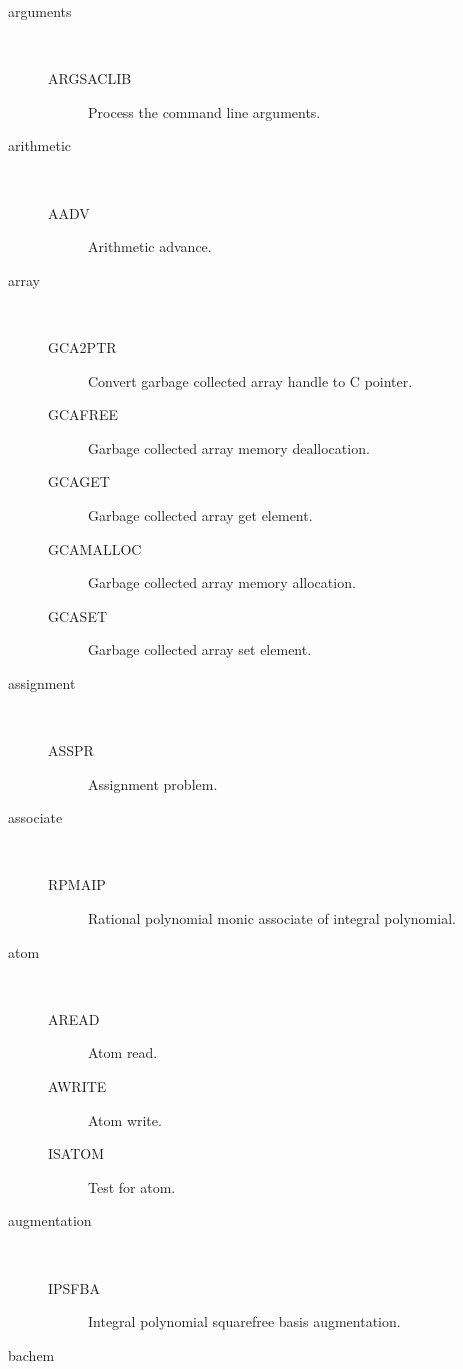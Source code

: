 \begin{description}
\begin{description}
  \end{description}
\item[arguments] \ \ 
  \begin{description}
  \item[ARGSACLIB]  Process the command line arguments.
  \end{description}
\item[arithmetic] \ \ 
  \begin{description}
  \item[AADV]  Arithmetic advance.
  \end{description}
\item[array] \ \ 
  \begin{description}
  \item[GCA2PTR]  Convert garbage collected array handle to C pointer.
  \item[GCAFREE]  Garbage collected array memory deallocation.
  \item[GCAGET]  Garbage collected array get element.
  \item[GCAMALLOC]  Garbage collected array memory allocation.
  \item[GCASET]  Garbage collected array set element.
  \end{description}
\item[assignment] \ \ 
  \begin{description}
  \item[ASSPR]  Assignment problem.
  \end{description}
\item[associate] \ \ 
  \begin{description}
  \item[RPMAIP]  Rational polynomial monic associate of integral polynomial.
  \end{description}
\item[atom] \ \ 
  \begin{description}
  \item[AREAD]  Atom read.
  \item[AWRITE]  Atom write.
  \item[ISATOM]  Test for atom.
  \end{description}
\item[augmentation] \ \ 
  \begin{description}
  \item[IPSFBA]  Integral polynomial squarefree basis augmentation.
  \end{description}
\item[bachem] \ \ 
  \begin{description}

\end{description}
\end{description}
